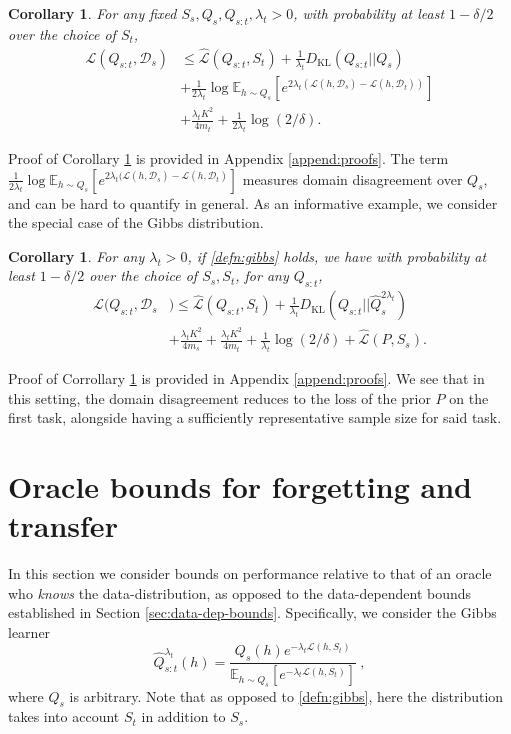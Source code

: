 \documentclass{article}
\theoremstyle{plain}
\newtheorem{corollary}[theorem]{Corollary}
\theoremstyle{definition}
\theoremstyle{remark}
\begin{document}
\begin{corollary}\label{thm:first}
For any fixed $S_s,Q_s,Q_{s:t},\lambda_t>0$, with probability at least $1-\delta/2$ over the choice of $S_t$,
\begin{align}
\mathcal{L}(Q_{s:t}, \mathcal{D}_s) &\leq \hat{\mathcal{L}}(Q_{s:t}, S_t) + \frac{1}{\lambda_t} D_{\mathrm{KL}}(Q_{s:t}||Q_{s})\nonumber\\
&+\frac{1}{2\lambda_t}\log \mathbb{E}_{h\sim Q_{s}}\left [e^{2\lambda_t(\mathcal{L}(h,\mathcal{D}_s)-\mathcal{L}(h,\mathcal{D}_t))}\right ]\nonumber\\ &+\frac{\lambda_t K^2}{4m_t}+\frac{1}{2\lambda_t}\log(2/\delta) .
\end{align}
\end{corollary}

Proof of Corollary \ref{thm:first} is provided in Appendix \ref{append:proofs}. The term $\frac{1}{2\lambda_t}\log \mathbb{E}_{h\sim Q_{s}}\left [e^{2\lambda_t(\mathcal{L}(h,\mathcal{D}_s)-\mathcal{L}(h,\mathcal{D}_t)}\right ]$ measures domain disagreement over $Q_s$, and can be hard to quantify in general. As an informative example, we  consider the special case of the Gibbs distribution.
%
\begin{corollary}
 \label{thm:gibbs-general}
For any $\lambda_t>0$, if \eqref{defn:gibbs} holds, we have with probability at least $1-\delta/2$ over the choice of $S_s,S_t$, for any $Q_{s:t}$, 
%
\begin{align}
\mathcal{L}(Q_{s:t}, \mathcal{D}_s&) \leq \hat{\mathcal{L}}(Q_{s:t}, S_t) + \frac{1}{\lambda_t} D_{\mathrm{KL}}(Q_{s:t}||\hat{Q}_{s}^{2\lambda_t}) \\
&+\frac{\lambda_t K^2}{4m_s}+\frac{\lambda_t K^2}{4m_t}+\frac{1}{\lambda_t}\log(2/\delta)+ \hat{\mathcal{L}}(P, S_s) . \nonumber
\end{align}
\end{corollary}
%
Proof of Corrollary \ref{thm:gibbs-general} is provided in Appendix \ref{append:proofs}. We see that in this setting, the domain disagreement reduces to the loss of the prior $P$ on the first task, alongside having a sufficiently representative sample size for said task.

\section{Oracle bounds for forgetting and transfer}\label{sec:oracle-bounds}

In this section we consider bounds on performance relative to that of an oracle who \emph{knows} the data-distribution, as opposed to the data-dependent bounds established in Section \ref{sec:data-dep-bounds}. Specifically, we consider the Gibbs learner
\begin{equation}\label{eq:Gibbd-dustrib}
\hat{Q}^{\lambda_t}_{s:t}(h)=\frac{Q_s(h)e^{-\lambda_t\mathcal{L}(h,S_t)}}{\mathbb{E}_{h\sim Q_s}\left [e^{-\lambda_t\mathcal{L}(h,S_t)}\right ]}~, 
\end{equation}
where $Q_s$ is arbitrary.
Note that as opposed to \eqref{defn:gibbs}, here the distribution takes into account $S_t$ in addition to $S_s$.
\end{document}

